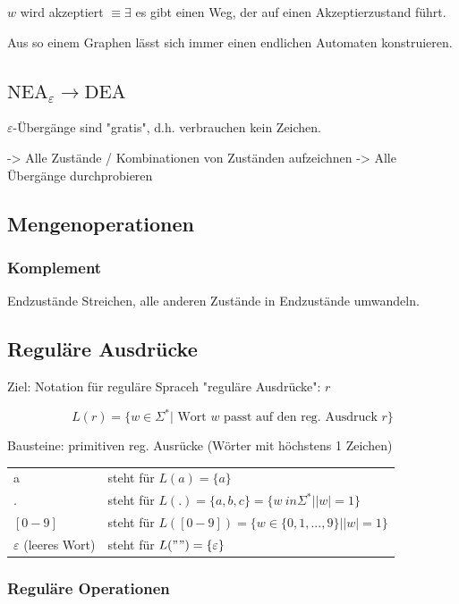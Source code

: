 $w$ wird akzeptiert $\equiv \exists$  es gibt einen Weg, der auf einen Akzeptierzustand führt.

Aus so einem Graphen lässt sich immer einen endlichen Automaten konstruieren.


\subsection{$\text{NEA}_\varepsilon \to \text{DEA}$}

$\varepsilon$-Übergänge sind "gratis", d.h. verbrauchen kein Zeichen.


-> Alle Zustände / Kombinationen von Zuständen aufzeichnen
-> Alle Übergänge durchprobieren


\subsection{Mengenoperationen}
\subsubsection{Komplement}

Endzustände Streichen, alle anderen Zustände in Endzustände umwandeln.


\subsection{Reguläre Ausdrücke}

Ziel: Notation für reguläre Spraceh "reguläre Ausdrücke": $r$

\[
	L(r) = \{ w \in \Sigma^\ast | \text{ Wort } w \text{ passt auf den reg. Ausdruck } r\}
\]

Bausteine: primitiven reg. Ausrücke (Wörter mit höchstens 1 Zeichen)

\begin{tabular}{ l l}
	a & steht für $L(a) = \{ a \}$ \\
	. & steht für $L(.) = \{a,b,c\} = \{ w \ in \Sigma ^ \ast | |w| = 1 \}$\\
	$[0-9]$ & steht für $L([0-9])=\{w \in \{ 0, 1, ..., 9\}| |w| = 1 \}$\\
	$\varepsilon$ (leeres Wort) & steht für $L("") = \{ \varepsilon \}$
\end{tabular}

\subsubsection{Reguläre Operationen}


